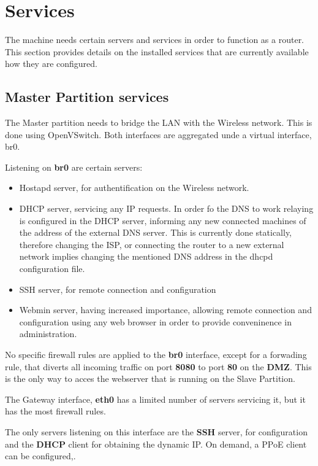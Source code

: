 \section{Services}
\label{sec:services}


The machine needs certain servers and services in order to function as a 
router. This section provides details on the installed services that are
currently available how they are configured.

\subsection{Master Partition services}
The Master partition needs to bridge the LAN with the Wireless network.
This is done using OpenVSwitch. Both interfaces are aggregated unde a
virtual interface, br0.

Listening on \textbf{br0} are certain servers:
\begin{itemize}
	\item Hostapd server, for authentification on the Wireless network.
	\item DHCP server, servicing any IP requests. In order fo the DNS to work
	relaying is configured in the DHCP server, informing any new connected
	machines of the address of the external DNS server. This is currently
	done statically, therefore changing the ISP, or connecting the router
	to a new external network implies changing the mentioned DNS address
	in the dhcpd configuration file.
	\item SSH server, for remote connection and configuration
	\item Webmin server, having increased importance, allowing
	remote connection and configuration using any web browser in order
	to provide conveninence in administration.
\end{itemize}

No specific firewall rules are applied to the \textbf{br0} interface, except
for a forwading rule, that diverts all incoming traffic on port \textbf{8080} 
to port \textbf{80} on the \textbf{DMZ}. This is the only way to acces 
the webserver that is running on the Slave Partition.

The Gateway interface, \textbf{eth0} has a limited number of servers servicing
it, but it has the most firewall rules.

The only servers listening on this interface are the \textbf{SSH} server, for
configuration and the \textbf{DHCP} client for obtaining the dynamic IP.
On demand, a PPoE client can be configured,.

